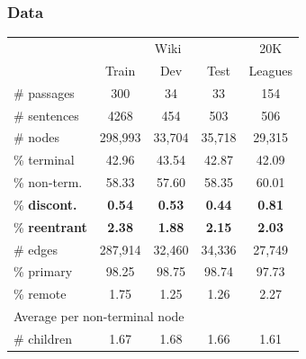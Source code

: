 \documentclass[t,xcolor={svgnames}]{beamer}
\begin{document}
\begin{frame}
\frametitle{Data}
\centering
\begin{tabular}{l|ccc|c}
	& \multicolumn{3}{c|}{Wiki} & 20K \\
	& \small Train & \small Dev & \small Test & Leagues \\
	\hline
	\# passages & 300 & 34 & 33 & 154 \\
	\# sentences & 4268 & 454 & 503 & 506 \\
	\hline
	\# nodes & 298,993 & 33,704 & 35,718 & 29,315 \\
	\% terminal & 42.96 & 43.54 & 42.87 & 42.09 \\
	\% non-term. & 58.33 & 57.60 & 58.35 & 60.01 \\
	\% \textbf{discont.} & \textbf{0.54} & \textbf{0.53} & \textbf{0.44} & \textbf{0.81} \\
	\% \textbf{reentrant} & \textbf{2.38} & \textbf{1.88} & \textbf{2.15} & \textbf{2.03} \\
	\hline
	\# edges & 287,914 & 32,460 & 34,336 & 27,749 \\
	\% primary & 98.25 & 98.75 & 98.74 & 97.73 \\
	\% remote & 1.75 & 1.25 & 1.26 & 2.27 \\
	\hline
	\multicolumn{3}{l}{\footnotesize Average per non-terminal node} \\
	\# children & 1.67 & 1.68 & 1.66 & 1.61 
\end{tabular}
\end{frame}
\end{document}
